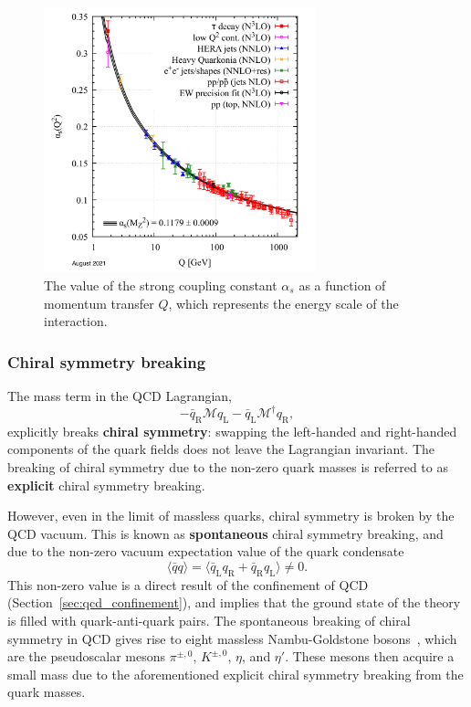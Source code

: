 \begin{figure}
    \centering
    \includegraphics[width=0.7\textwidth]{figures/introduction/running_coupling.png}
    \caption{The value of the strong coupling constant $\alpha_s$ as a function of momentum transfer $Q$, which represents the energy scale of the interaction.}
    \label{fig:asymptotic_freedom}
\end{figure}

\subsubsection{Chiral symmetry breaking}
\label{sec:chiral_symmetry_breaking}

The mass term in the QCD Lagrangian,
\begin{equation}
    -\bar{q}_{\mathrm{R}} \mathcal{M} q_{\mathrm{L}}-\bar{q}_{\mathrm{L}} \mathcal{M}^{\dagger} q_{\mathrm{R}},
\end{equation}
explicitly breaks \textbf{chiral symmetry}: swapping the left-handed and right-handed components of the quark fields does not leave the Lagrangian invariant. The breaking of chiral symmetry due to the non-zero quark masses is referred to as \textbf{explicit} chiral symmetry breaking.

However, even in the limit of massless quarks, chiral symmetry is broken by the QCD vacuum. This is known as \textbf{spontaneous} chiral symmetry breaking, and due to the non-zero vacuum expectation value of the quark condensate~\cite{QuarkCondensate}
%
\begin{equation}
    \label{eq:quark_condensate}
    \langle \bar{q}q \rangle = \langle \bar{q}_\text{L}q_\text{R} + \bar{q}_\text{R}q_\text{L} \rangle \neq 0.
\end{equation}
%
This non-zero value is a direct result of the confinement of QCD~\cite{TongGaugeTheory} (Section~\ref{sec:qcd_confinement}), and implies that the ground state of the theory is filled with quark-anti-quark pairs. The spontaneous breaking of chiral symmetry in QCD gives rise to eight massless Nambu-Goldstone bosons~\cite{NambuGoldstone}, which are the pseudoscalar mesons $\pi^{\pm, 0}$, $K^{\pm, 0}$, $\eta$, and $\eta'$. These mesons then acquire a small mass due to the aforementioned explicit chiral symmetry breaking from the quark masses. 

